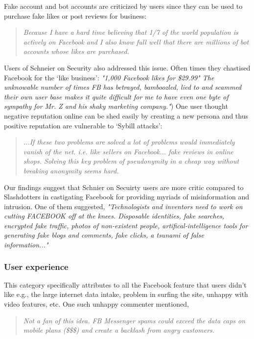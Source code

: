     Fake account and bot accounts are criticized \cite{ferrara2016rise} by users since they can be used to purchase fake likes or post reviews for business:
    \begin{quote}
         \textit{Because I have a hard time believing that 1/7 of the world population is actively on Facebook and I also know full well that there are millions of bot accounts whose likes are purchased. }
    \end{quote}
    
    Users of Schneier on Security also addressed this issue. Often times they chastised Facebook for the `like business': \textit{"1,000 Facebook likes for \$29.99" The unknowable number of times FB has betrayed, bamboozled, lied to and scammed their own user base makes it quite difficult for me to have even one byte of sympathy for Mr. Z and his shaky marketing company."}) One user thought negative reputation online can be shed easily by creating a new persona and thus positive reputation are vulnerable to `Sybill attacks':
    \begin{quote}
         \textit{...If these two problems are solved a lot of problems would immediately vanish of the net. i.e. like sellers on Facebook... fake reviews in online shops. Solving this key problem of pseudonymity in a cheap way without breaking anonymity seems hard. }
    \end{quote}
    
    Our findings suggest that Schnier on Secuirty users are more critic compared to Slashdotters in castigating Facebook for providing myriads of misinformation and intrusion. One of them suggested, \textit{"Technologists and inventors need to work on cutting FACEBOOK off at the knees. Disposable identities, fake searches, encrypted fake traffic, photos of non-existent people, artifical-intelligence tools for generating fake blogs and comments, fake clicks, a tsunami of false information..."}
    
 \subsubsection{User experience}
 This category specifically attributes to all the Facebook feature that users didn't like e.g., the large internet data intake, problem in surfing the site, unhappy with video features, etc. One such unhappy commenter mentioned, 
     \begin{quote}
         \textit{Not a fan of this idea. FB Messenger spams could exceed the data caps on mobile plans (\$\$\$) and create a backlash from angry customers.}
     \end{quote}
    
